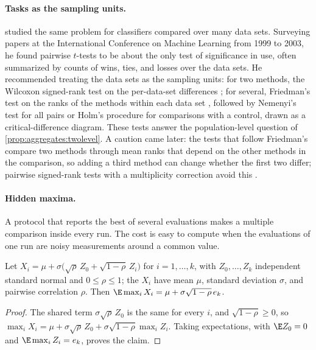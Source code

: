 \begin{refsection}
\paragraph{Tasks as the sampling units.} \Textcite{Demsar2006} studied the same problem for classifiers compared over many data sets. Surveying papers at the International Conference on Machine Learning from 1999 to 2003, he found pairwise $t$-tests to be about the only test of significance in use, often summarized by counts of wins, ties, and losses over the data sets. He recommended treating the data sets as the sampling units: for two methods, the Wilcoxon signed-rank test on the per-data-set differences \parencite{Wilcoxon1945}; for several, Friedman's test on the ranks of the methods within each data set \parencite{Friedman1937}, followed by Nemenyi's test for all pairs or Holm's procedure for comparisons with a control, drawn as a critical-difference diagram. These tests answer the population-level question of \cref{prop:aggregates:twolevel}. A caution came later: the tests that follow Friedman's compare two methods through mean ranks that depend on the other methods in the comparison, so adding a third method can change whether the first two differ; pairwise signed-rank tests with a multiplicity correction avoid this \parencite{BenavoliEtAl2016}.

\paragraph{Hidden maxima.} A protocol that reports the best of several evaluations makes a multiple comparison inside every run. The cost is easy to compute when the evaluations of one run are noisy measurements around a common value.

\begin{proposition}\label{prop:aggregates:hiddenmax}
Let $X_i=\mu+\sigma\bigl(\sqrt\rho\,Z_0+\sqrt{1-\rho}\,Z_i\bigr)$ for $i=1,\dots,k$, with $Z_0,\dots,Z_k$ independent standard normal and $0\le\rho\le1$; the $X_i$ have mean $\mu$, standard deviation $\sigma$, and pairwise correlation $\rho$. Then $\E\max_iX_i=\mu+\sigma\sqrt{1-\rho}\,e_k$.
\end{proposition}

\begin{proof}
The shared term $\sigma\sqrt\rho\,Z_0$ is the same for every $i$, and $\sqrt{1-\rho}\ge0$, so $\max_iX_i=\mu+\sigma\sqrt\rho\,Z_0+\sigma\sqrt{1-\rho}\max_iZ_i$. Taking expectations, with $\E Z_0=0$ and $\E\max_iZ_i=e_k$, proves the claim.
\end{proof}


\end{refsection}
